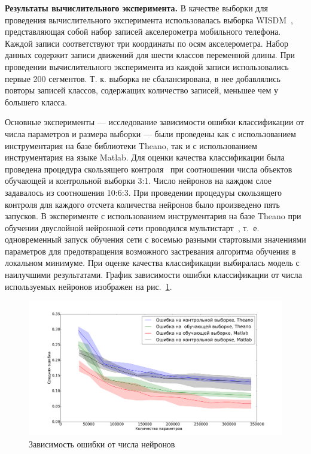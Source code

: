 \textbf{Результаты вычислительного эксперимента. }
В качестве выборки для проведения вычислительного эксперимента использовалась выборка WISDM~\cite{wisdm}, представляющая собой набор записей акселерометра мобильного телефона. Каждой записи соответствуют три координаты по осям акселерометра. Набор данных содержит записи движений для шести классов переменной длины.
При проведении вычислительного эксперимента из каждой записи использовались первые 200 сегментов. Т. к. выборка не сбалансирована, в нее добавлялись повторы записей классов, содержащих количество записей, меньшее чем у большего класса.

Основные эксперименты --- исследование зависимости ошибки классификации от числа параметров и размера выборки --- были проведены как с использованием инструментария на базе библиотеки Theano, так и с использованием инструментария на языке Matlab.
Для оценки качества классификации была проведена процедура скользящего контроля~\cite{cv_ms} при соотношении числа объектов обучающей и контрольной выборки 3:1. Число нейронов на каждом слое задавалось из соотношения 10:6:3. При проведении процедуры скользящего контроля для каждого отсчета количества нейронов было произведено пять запусков. В эксперименте с использованием инструментария на базе Theano при обучении двуслойной нейронной сети проводился мультистарт~\cite{multi}, т.~е. одновременный запуск обучения сети с восемью разными стартовыми значениями параметров для предотвращения возможного застревания алгоритма обучения в локальном минимуме. При оценке качества классификации выбиралась модель с наилучшими результатами. График зависимости ошибки классификации от числа используемых нейронов изображен на рис.~\ref{fig:neurons}.


\begin{figure}[tb!]
 \centering
  \includegraphics[width=1.0\textwidth]{plots/popova/neurons.pdf}
 \caption{Зависимость ошибки от числа нейронов}
 \label{fig:neurons}
\end{figure}


